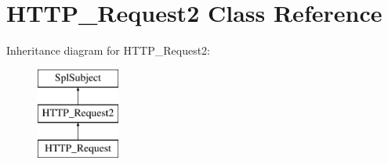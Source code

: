 \hypertarget{classHTTP__Request2}{}\section{H\+T\+T\+P\+\_\+\+Request2 Class Reference}
\label{classHTTP__Request2}
Inheritance diagram for H\+T\+T\+P\+\_\+\+Request2\+:\begin{figure}[H]
\begin{center}
\leavevmode
\includegraphics[height=3.000000cm]{classHTTP__Request2}
\end{center}
\end{figure}

